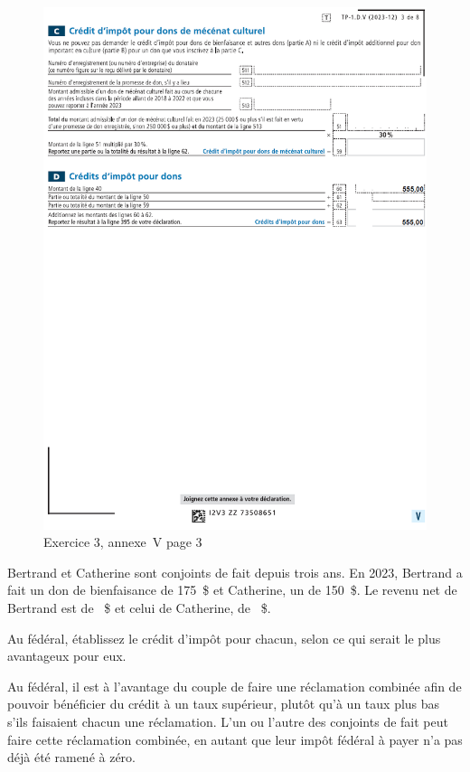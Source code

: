 \begin{figure}
	\centering
	\includegraphics[width=.9\textwidth]{exercice/7-3/Q6/AnnexeVp3.png}
	\caption[]{Exercice 3, annexe~V page 3}
	\label{fig:chap7Exercice3AnnexeVp3}
\end{figure}

\begin{question}
	Bertrand et Catherine sont conjoints de fait depuis trois ans. En 2023, Bertrand a fait un don de bienfaisance de 175~\$ et Catherine, un de 150~\$. Le revenu net de Bertrand est de ~\$ et celui de Catherine, de ~\$.
	
	Au fédéral, établissez le crédit d'impôt pour chacun, selon ce qui serait le plus avantageux pour eux.
\end{question}
Au fédéral, il est à l'avantage du couple de faire une réclamation combinée afin de pouvoir bénéficier du crédit à un taux supérieur, plutôt qu'à un taux plus bas s'ils faisaient chacun une réclamation.
L'un ou l'autre des conjoints de fait peut faire cette réclamation combinée, en autant que leur impôt fédéral à payer n'a pas déjà été ramené à zéro.

